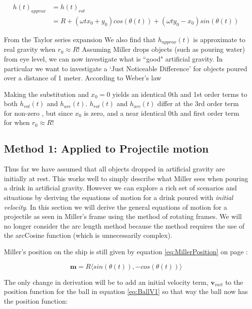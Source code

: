 \documentclass{amsart}
\renewcommand{\vec}{\textbf}
\theoremstyle{definition}
\begin{document}
\begin{equation}\label{eq:approxGravHeight}
\begin{split}
    h(t)_{approx} &= h(t)_{rot} \\
    &=R+(\omega t x_0 + y_0)cos(\theta(t))+(\omega t y_0 - x_0)sin(\theta (t))
\end{split}
\end{equation}

From the Taylor series expansion We also find that $h_{approx}(t)$ is approximate to real gravity when $r_0 \approx R$! Assuming Miller drops objects (such as pouring water) from eye level, we can now investigate what is ``good" artificial gravity. In particular we want to investigate a `Just Noticeable Difference' for objects poured over a distance of 1 meter. According to Weber's law

Making the substitution  and $x_0 =0$ yields an identical 0th and 1st order terms to both $h_{rot}(t)$ and $h_{arc}(t)$. $h_{rot}(t)$ and $h_{arc}(t)$ differ at the 3rd order term for non-zero , but since $x_0$ is zero,  and a near identical 0th and first order term for  when $r_0 \approx R$! 


\subsection*{Method 1: Applied to Projectile motion}
Thus far we have assumed that all objects dropped in artificial
gravity are initially at rest. This works well to simply describe what
Miller sees when pouring a drink in artificial gravity. However we can
explore a rich set of scenarios and situations by deriving the
equations of motion for a drink poured with \textit{initial
  velocity}. In this section we will derive the general equations of
motion for a projectile as seen in Miller's frame using the method of
rotating frames. We will no longer consider the arc length method
because the method requires the use of the arcCosine function (which
is unnecessarily complex).


Miller's position on the ship is still given by equation
\ref{eq:MillerPosition} on page \pageref{eq:MillerPosition}:

\[\vec{m} = R\langle sin(\theta (t) ), - cos (\theta (t) ) \rangle\]

The only change in derivation will be to add an initial velocity term,
$\vec{v}_{init}$ to the position function for the ball in equation
\ref{eq:BallV1} so that way the ball now has the position function:
\end{document}
